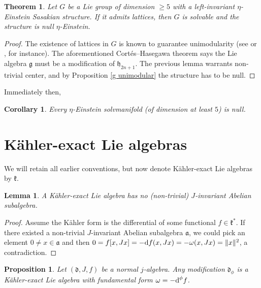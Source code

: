 \documentclass[12pt, twoside]{amsart}
\def\D{\textup{d}}
\def\d{\mathfrak{d}}
\def\k{\mathfrak{k}}
\def\g{\mathfrak{g}}
\def\a{\mathfrak{a}}
\renewcommand{\geq}{\geqslant}\renewcommand{\leq}{\leqslant}
\newtheorem{prop}[definition]{Proposition}
\newtheorem{coro}[definition]{Corollary}
\newtheorem{lemma}[definition]{Lemma}
\newtheorem{thm}[definition]{Theorem}
\theoremstyle{definition}
\begin{document}
\smallskip

\begin{thm}\label{thm: lattices}
   Let $G$ be a Lie group of dimension $\geq 5$ with a left-invariant $\eta$-Einstein Sasakian structure. If it admits lattices, then $G$ is solvable and the structure is null $\eta$-Einstein. 
\end{thm}
    
\begin{proof} 
The existence of lattices in $G$ is known to guarantee unimodularity (see \cite{Raghunathan} or \cite{Mil}, for instance). The aforementioned Cort{\'e}s--Hasegawa theorem says the Lie algebra $\g$ must be a modification of $\mathfrak{h}_{2n+1}$. The previous lemma warrants non-trivial center, and by Proposition \ref{g unimodular} the structure has to be null.
\end{proof}

\smallskip

Immediately then, 
\begin{coro}
Every $\eta$-Einstein solvmanifold (of dimension at least $5$) is null.
\end{coro}


\medskip

\section{K{\"a}hler-exact Lie algebras}

We will retain all earlier conventions, but now denote K{\"a}hler-exact Lie algebras by $\k$. 

\begin{lemma} \label{exacta no poseen abeliana}
A K{\"a}hler-exact Lie algebra has no (non-trivial) $J$-invariant Abelian subalgebra.
\end{lemma}

\begin{proof}
Assume the K{\"a}hler form is the differential of some functional $f \in \k^*$. 
If there existed a non-trivial $J$-invariant Abelian subalgebra $\a$, we could pick an element $ 0\neq x \in \a$ and then  $0=f[x,Jx]=-\D f(x,Jx)=-\omega(x,Jx)=\|x\|^2$, a contradiction. 
  \end{proof}

\begin{prop} \label{modi preserva exacta}
    Let $(\d, J, f)$ be a  normal $j$-algebra. Any modification $\d_{\phi}$ is a 
    K{\"a}hler-exact Lie algebra with fundamental form $\omega=-\D^{\phi}f$.
\end{prop}
\end{document}
